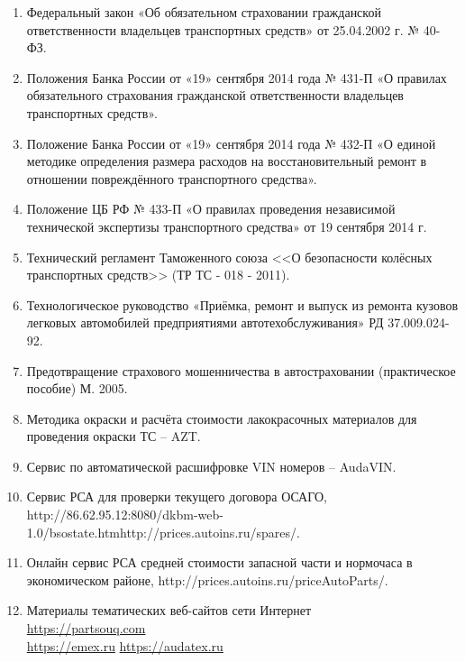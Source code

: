 \begin{enumerate}
\item   Федеральный закон «Об обязательном страховании гражданской ответственности владельцев транспортных средств» от 25.04.2002 г. № 40-ФЗ.
\item  Положения Банка России от «19» сентября 2014 года № 431-П «О правилах обязательного страхования гражданской ответственности владельцев транспортных средств».
\item  Положение Банка России от «19» сентября 2014 года № 432-П «О единой методике определения размера расходов на восстановительный ремонт в отношении повреждённого транспортного средства».
\item  Положение ЦБ РФ № 433-П «О правилах проведения независимой технической экспертизы транспортного средства» от 19 сентября 2014 г.
\item  Технический регламент Таможенного союза <<О безопасности колёсных транспортных средств>> (ТР ТС - 018 - 2011).
\item  Технологическое руководство «Приёмка, ремонт и выпуск из ремонта кузовов легковых автомобилей предприятиями автотехобслуживания» РД 37.009.024-92.
\item  Предотвращение страхового мошенничества в автостраховании  (практическое  пособие)  М.  2005.
\item  Методика окраски и расчёта стоимости лакокрасочных материалов для проведения окраски ТС – AZT. 
\item  Сервис по автоматической расшифровке VIN номеров – AudaVIN.
\item  Сервис РСА для проверки текущего договора ОСАГО,  http://86.62.95.12:8080/dkbm-web-1.0/bsostate.htmhttp://prices.autoins.ru/spares/.
\item  Онлайн сервис РСА средней стоимости запасной части и нормочаса в экономическом районе,    http://prices.autoins.ru/priceAutoParts/.
\item  	Материалы тематических веб-сайтов сети Интернет\\
\url{https://partsouq.com}\\
\url{https://emex.ru}
\url{https://audatex.ru}
\end{enumerate}


